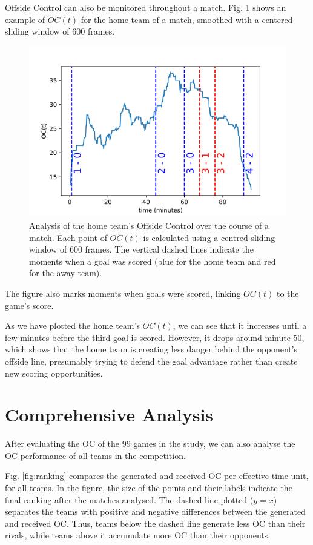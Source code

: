 \documentclass[
  10pt,
  twoside,nohyper]{book}
\begin{document}
Offside Control can also be monitored throughout a match. Fig. \ref{fig:oct} shows an example of \(OC(t)\) for the home team of a match, smoothed with a centered sliding window of 600 frames.

\begin{figure}[H]

{\centering \includegraphics[width=0.8\linewidth,]{imagenes/cumulative_OC_evolution} 

}

\caption{Analysis of the home team's Offside Control over the course of a match. Each point of $OC(t)$ is calculated using a centred sliding window of 600 frames. The vertical dashed lines indicate the moments when a goal was scored (blue for the home team and red for the away team).}\label{fig:oct}
\end{figure}

The figure also marks moments when goals were scored, linking \(OC(t)\) to the game's score.

As we have plotted the home team's \(OC(t)\), we can see that it increases until a few minutes before the third goal is scored. However, it drops around minute 50, which shows that the home team is creating less danger behind the opponent's offside line, presumably trying to defend the goal advantage rather than create new scoring opportunities.

\section{Comprehensive Analysis}\label{comprehensive-analysis}

After evaluating the OC of the 99 games in the study, we can also analyse the OC performance of all teams in the competition.

Fig. \ref{fig:ranking} compares the generated and received OC per effective time unit, for all teams. In the figure, the size of the points and their labels indicate the final ranking after the matches analysed. The dashed line plotted (\(y=x\)) separates the teams with positive and negative differences between the generated and received OC. Thus, teams below the dashed line generate less OC than their rivals, while teams above it accumulate more OC than their opponents.
\end{document}
